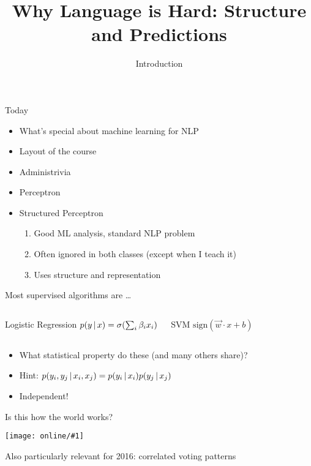 \documentclass[compress]{beamer}
\title{Why Language is Hard: Structure and Predictions}
\date{Introduction}
\newcommand{\gfx}[2]{
\begin{center}
	\texttt{[image: online/\#1]}
\end{center}
}
\begin{document}
\frame{
\titlepage
}

\begin{frame}{Today}

  \begin{itemize}
    \item What's special about machine learning for NLP
    \item Layout of the course
    \item Administrivia
    \item Perceptron
    \item Structured Perceptron
      \pause
      \begin{enumerate}
    \item Good ML analysis, standard NLP problem
    \item Often ignored in both classes (except when I teach it)
    \item Uses structure and representation
      \end{enumerate}
  \end{itemize}

\end{frame}

\begin{frame}{Most supervised algorithms are \dots}

\begin{columns}
  \begin{block}{Logistic Regression}
    \pause
    $p(y \, | \, x) = \sigma(\sum_i \beta_i x_i)$
  \end{block}

  \begin{block}{SVM}
    \pause
    $\mbox{sign}(\vec w \cdot x + b)$
  \end{block}
\end{columns}

\begin{itemize}
  \item What statistical property do these (and many others share)?
    \pause
   \item Hint: $p(y_i,y_j \, | \, x_i, x_j) = p(y_i \, | \, x_i) p(y_j \, | \, x_j)$
     \pause
    \item Independent!
\end{itemize}

\end{frame}

\begin{frame}{Is this how the world works?}

  \gfx{sequences}{0.6}
  \pause
  Also particularly relevant for 2016: correlated voting patterns

\end{frame}
\end{document}
